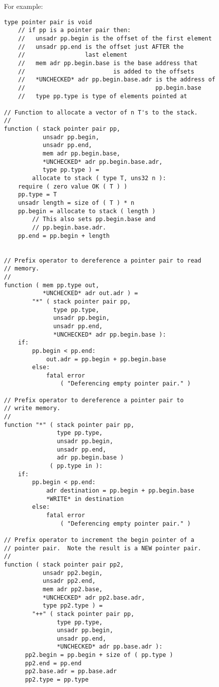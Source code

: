 \documentclass[12pt]{article}
\newenvironment{indpar}[1][0.3in]%
	{\begin{list}{}%
		     {\setlength{\itemsep}{0in}%
		      \setlength{\topsep}{0in}%
		      \setlength{\parsep}{1ex}%
		      \setlength{\labelwidth}{#1}%
		      \setlength{\leftmargin}{#1}%
		      \addtolength{\leftmargin}{\labelsep}}%
	 \item}%
	{\end{list}}
\begin{document}
For example:
\begin{indpar}\begin{verbatim}
type pointer pair is void
    // if pp is a pointer pair then:
    //   unsadr pp.begin is the offset of the first element
    //   unsadr pp.end is the offset just AFTER the
    //                 last element
    //   mem adr pp.begin.base is the base address that
    //                         is added to the offsets
    //   *UNCHECKED* adr pp.begin.base.adr is the address of
    //                                     pp.begin.base
    //   type pp.type is type of elements pointed at

// Function to allocate a vector of n T's to the stack.
//
function ( stack pointer pair pp,
           unsadr pp.begin,
           unsadr pp.end,
           mem adr pp.begin.base,
           *UNCHECKED* adr pp.begin.base.adr,
           type pp.type ) =
        allocate to stack ( type T, uns32 n ):
    require ( zero value OK ( T ) )
    pp.type = T
    unsadr length = size of ( T ) * n
    pp.begin = allocate to stack ( length )
        // This also sets pp.begin.base and
        // pp.begin.base.adr.
    pp.end = pp.begin + length


// Prefix operator to dereference a pointer pair to read
// memory.
//
function ( mem pp.type out,
           *UNCHECKED* adr out.adr ) =
        "*" ( stack pointer pair pp,
              type pp.type,
              unsadr pp.begin,
              unsadr pp.end,
              *UNCHECKED* adr pp.begin.base ):
    if:
        pp.begin < pp.end:
            out.adr = pp.begin + pp.begin.base
        else:
            fatal error
                ( "Deferencing empty pointer pair." )

// Prefix operator to dereference a pointer pair to
// write memory.
//
function "*" ( stack pointer pair pp,
               type pp.type,
               unsadr pp.begin,
               unsadr pp.end,
               adr pp.begin.base )
             ( pp.type in ):
    if:
        pp.begin < pp.end:
            adr destination = pp.begin + pp.begin.base
            *WRITE* in destination
        else:
            fatal error
                ( "Deferencing empty pointer pair." )

// Prefix operator to increment the begin pointer of a
// pointer pair.  Note the result is a NEW pointer pair.
//
function ( stack pointer pair pp2,
           unsadr pp2.begin,
           unsadr pp2.end,
           mem adr pp2.base,
           *UNCHECKED* adr pp2.base.adr,
           type pp2.type ) =
        "++" ( stack pointer pair pp,
               type pp.type,
               unsadr pp.begin,
               unsadr pp.end,
               *UNCHECKED* adr pp.base.adr ):
      pp2.begin = pp.begin + size of ( pp.type )
      pp2.end = pp.end
      pp2.base.adr = pp.base.adr
      pp2.type = pp.type


\end{verbatim}
\end{indpar}
\end{document}
